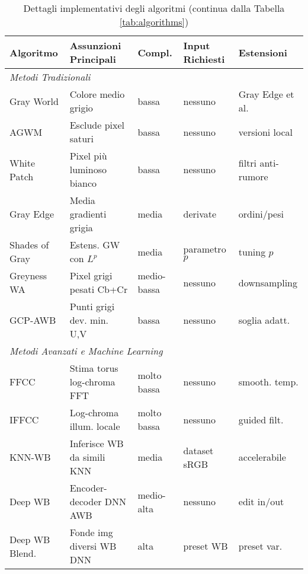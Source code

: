 \begin{table}[htbp]
\centering
\caption{Dettagli implementativi degli algoritmi (continua dalla Tabella \ref{tab:algorithms})}
\footnotesize
\begin{tabularx}{\textwidth}{l>{\raggedright\arraybackslash}Xl>{\raggedright\arraybackslash}X>{\raggedright\arraybackslash}X}
\toprule
\textbf{Algoritmo} & \textbf{Assunzioni Principali} & \textbf{Compl.} & \textbf{Input Richiesti} & \textbf{Estensioni} \\
\midrule
\multicolumn{5}{l}{\textit{Metodi Tradizionali}} \\
\midrule
Gray World & Colore medio grigio & bassa & nessuno & Gray Edge et al. \\
AGWM & Esclude pixel saturi & bassa & nessuno & versioni local \\
White Patch & Pixel più luminoso bianco & bassa & nessuno & filtri anti-rumore \\
Gray Edge & Media gradienti grigia & media & derivate & ordini/pesi \\
Shades of Gray & Estens. GW con $L^p$ & media & parametro $p$ & tuning $p$ \\
Greyness WA & Pixel grigi pesati Cb+Cr & medio-bassa & nessuno & downsampling \\
GCP-AWB & Punti grigi dev. min. U,V & bassa & nessuno & soglia adatt. \\
\midrule
\multicolumn{5}{l}{\textit{Metodi Avanzati e Machine Learning}} \\
\midrule
FFCC & Stima torus log-chroma FFT & molto bassa & nessuno & smooth. temp. \\
IFFCC & Log-chroma illum. locale & molto bassa & nessuno & guided filt. \\
KNN-WB & Inferisce WB da simili KNN & media & dataset sRGB & accelerabile \\
Deep WB & Encoder-decoder DNN AWB & medio-alta & nessuno & edit in/out \\
Deep WB Blend. & Fonde img diversi WB DNN & alta & preset WB & preset var. \\
\bottomrule
\end{tabularx}
\end{table}
